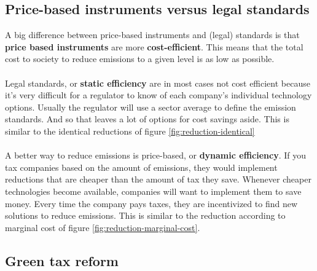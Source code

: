 \documentclass[../summary.tex]{subfiles}
\begin{document}
	\subsection{Price-based instruments versus legal standards}
	
	A big difference between price-based instruments and (legal) standards is that \textbf{price based instruments} are more \textbf{cost-efficient}. This means that the total cost to society to reduce emissions to a given level is as low as possible.
	\\\\
	Legal standards, or \textbf{static efficiency} are in most cases not cost efficient because it's very difficult for a regulator to know of each company's individual technology options. Usually the regulator will use a sector average to define the emission standards. And so that leaves a lot of options for cost savings aside. This is similar to the identical reductions of figure \ref{fig:reduction-identical}
	\\\\
	A better way to reduce emissions is price-based, or \textbf{dynamic efficiency}. If you tax companies based on the amount of emissions, they would implement reductions that are cheaper than the amount of tax they save. Whenever cheaper technologies become available, companies will want to implement them to save money. Every time the company pays taxes, they are incentivized to find new solutions to reduce emissions. This is similar to the reduction according to marginal cost of figure \ref{fig:reduction-marginal-cost}.
	
	\subsection{Green tax reform}
	
\end{document}
